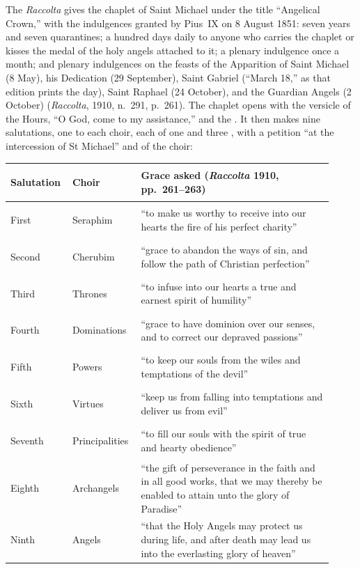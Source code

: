 The \emph{Raccolta} gives the chaplet of Saint Michael under the title
``Angelical Crown,'' with the indulgences granted by Pius~IX on 8 August
1851: seven years and seven quarantines; a hundred days daily to anyone
who carries the chaplet or kisses the medal of the holy angels attached
to it; a plenary indulgence once a month; and plenary indulgences on the
feasts of the Apparition of Saint Michael (8 May), his Dedication (29
September), Saint Gabriel (``March 18,'' as that edition prints the day),
Saint Raphael (24 October), and the Guardian Angels (2 October)
(\emph{Raccolta}, 1910, n.~291, p.~261). The chaplet opens with the
versicle of the Hours, ``O God, come to my assistance,'' and the
. It then makes nine salutations, one to each choir,
each of one  and three , with a petition ``at the
intercession of St Michael'' and of the choir:
\begingroup\small
\begin{longtable}{>{\bfseries\raggedright\arraybackslash}p{0.14\linewidth}>{\raggedright\arraybackslash}p{0.20\linewidth}>{\raggedright\arraybackslash}p{0.58\linewidth}}
\toprule
\textbf{Salutation} & \textbf{Choir} & \textbf{Grace asked (\emph{Raccolta} 1910, pp.~261--263)}\\
\midrule
\endhead
First & Seraphim & ``to make us worthy to receive into our hearts the
fire of his perfect charity''\\
Second & Cherubim & ``grace to abandon the ways of sin, and follow the
path of Christian perfection''\\
Third & Thrones & ``to infuse into our hearts a true and earnest spirit of
humility''\\
Fourth & Dominations & ``grace to have dominion over our senses, and to
correct our depraved passions''\\
Fifth & Powers & ``to keep our souls from the wiles and temptations of
the devil''\\
Sixth & Virtues & ``keep us from falling into temptations and deliver us
from evil''\\
Seventh & Principalities & ``to fill our souls with the spirit of true
and hearty obedience''\\
Eighth & Archangels & ``the gift of perseverance in the faith and in all
good works, that we may thereby be enabled to attain unto the glory of
Paradise''\\
Ninth & Angels & ``that the Holy Angels may protect us during life, and
after death may lead us into the everlasting glory of heaven''\\
\bottomrule
\end{longtable}
